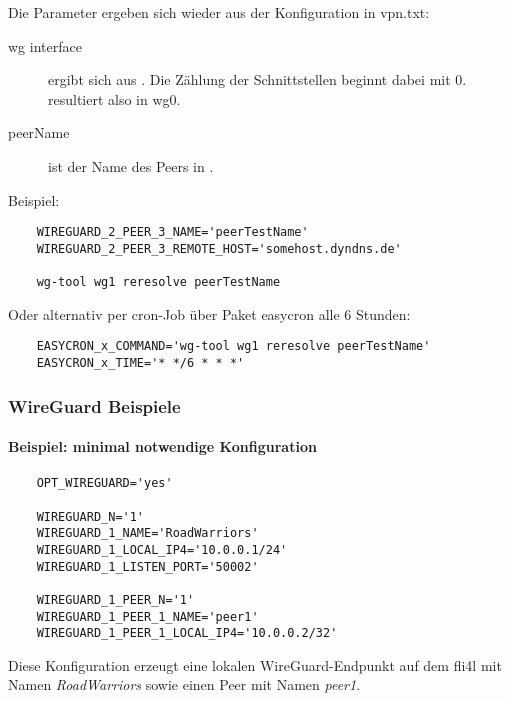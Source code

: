 Die Parameter ergeben sich wieder aus der Konfiguration in vpn.txt:
\begin{description}
    \item[wg interface] ergibt sich aus  . Die Zählung der 
    Schnittstellen beginnt dabei mit 0.  resultiert also in wg0.
    \item[peerName] ist der Name des Peers in .
\end{description}

Beispiel:
\begin{example}
\begin{verbatim}
    WIREGUARD_2_PEER_3_NAME='peerTestName'
    WIREGUARD_2_PEER_3_REMOTE_HOST='somehost.dyndns.de'

    wg-tool wg1 reresolve peerTestName
\end{verbatim}
\end{example}

Oder alternativ per cron-Job über Paket easycron alle 6 Stunden:
\begin{example}
\begin{verbatim}
    EASYCRON_x_COMMAND='wg-tool wg1 reresolve peerTestName'
    EASYCRON_x_TIME='* */6 * * *'
\end{verbatim}
\end{example}


\subsubsection{WireGuard Beispiele}

\paragraph{Beispiel: minimal notwendige Konfiguration}

\noindent

\begin{example}
\begin{verbatim}
    OPT_WIREGUARD='yes'

    WIREGUARD_N='1'
    WIREGUARD_1_NAME='RoadWarriors'
    WIREGUARD_1_LOCAL_IP4='10.0.0.1/24'
    WIREGUARD_1_LISTEN_PORT='50002'

    WIREGUARD_1_PEER_N='1'
    WIREGUARD_1_PEER_1_NAME='peer1'
    WIREGUARD_1_PEER_1_LOCAL_IP4='10.0.0.2/32'
\end{verbatim}
\end{example}

Diese Konfiguration erzeugt eine lokalen WireGuard-Endpunkt auf dem fli4l mit
Namen \emph{RoadWarriors} sowie einen Peer mit Namen \emph{peer1}.

